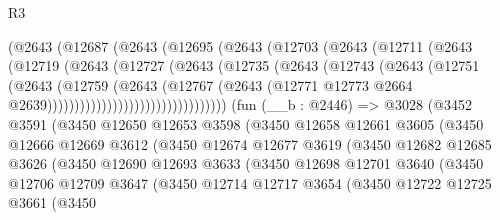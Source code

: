 \begin{lexlean}{R3}
\begin{coremodule}
                      (@2643
                        (@12687
                          (@2643
                            (@12695
                              (@2643
                                (@12703
                                  (@2643
                                    (@12711
                                      (@2643
                                        (@12719
                                          (@2643
                                            (@12727
                                              (@2643
                                                (@12735
                                                  (@2643
                                                    (@12743
                                                      (@2643
                                                        (@12751
                                                          (@2643
                                                            (@12759
                                                              (@2643
                                                                (@12767
                                                                  (@2643
                                                                    (@12771
                                                                      @12773
                                                                      @2664
                                                                      @2639)))))))))))))))))))))))))))))))))
    (fun (__b : @2446) =>
    @3028
      (@3452
        @3591
        (@3450
          @12650
          @12653
          @3598
          (@3450
            @12658
            @12661
            @3605
            (@3450
              @12666
              @12669
              @3612
              (@3450
                @12674
                @12677
                @3619
                (@3450
                  @12682
                  @12685
                  @3626
                  (@3450
                    @12690
                    @12693
                    @3633
                    (@3450
                      @12698
                      @12701
                      @3640
                      (@3450
                        @12706
                        @12709
                        @3647
                        (@3450
                          @12714
                          @12717
                          @3654
                          (@3450
                            @12722
                            @12725
                            @3661
                            (@3450

\end{coremodule}
\end{lexlean}
